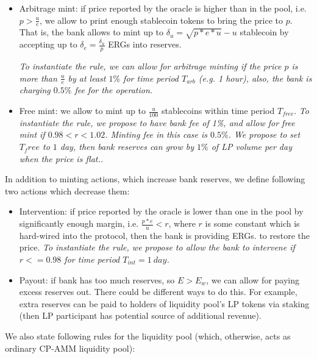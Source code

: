 \documentclass{article}   %
\newcommand{\bc}{ERG}
\newcommand{\sct}{stablecoin}
\begin{document}
\begin{itemize}
  \item{Arbitrage mint: } if price reported by the oracle is higher than in the pool, i.e. $p > \frac{u}{e}$, we allow to print enough \sct{} tokens to bring the price to $p$. That is, the bank allows to mint up to $\delta_u = \sqrt{p*e*u}-u$ \sct{} by accepting up to $\delta_e = \frac{\delta_u}{p}$ \bc{}s into reserves. 

  \em{To instantiate the rule, we can allow for arbitrage minting if the price $p$ is more than $\frac{u}{e}$ by at least $1\%$ for time period $T_{arb}$ (e.g. 1 hour), also, the bank is charging $0.5\%$ fee for the operation.} 

  \item{Free mint: } we allow to mint up to $\frac{u}{100}$ \sct{}s within time period $T_{free}$. 
  \em{To instantiate the rule, we propose to have bank fee of 1\%, and allow for free mint if $0.98 < r < 1.02$. Minting fee in this case is $0.5\%$. We propose to set $T_free$ to $1$ day, then bank reserves can grow by $1\%$ of LP volume per day when the price is flat.}. 
\end{itemize}  

In addition to minting actions, which increase bank reserves, we define following two actions which decrease them: 

\begin{itemize}
   \item{Intervention: } if price reported by the oracle is lower than one in the pool by significantly enough margin, i.e. $\frac{p*e}{u} < r$, where $r$ is some constant which is hard-wired into the protocol, then the bank is providing \bc{}s. to restore the price.
   \em{To instantiate the rule, we propose to allow the bank to intervene if $r <= 0.98$ for time period $T_{int} = 1 {\ day}$.}
   \item{Payout: } if bank has too much reserves, so $E > E_w$, we can allow for paying excess reserves out. There could be different ways to do this. For example, extra reserves can be paid to holders of liquidity pool's LP tokens via staking (then LP participant has potential source of additional revenue).
\end{itemize}


We also state following rules for the liquidity pool (which, otherwise, acts as ordinary CP-AMM liquidity pool): 
\end{document}
